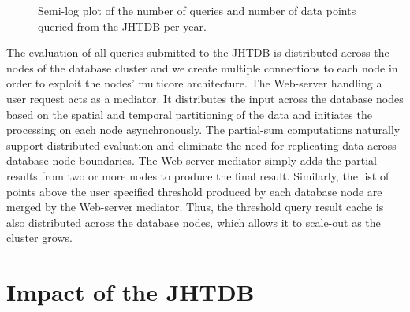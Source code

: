 \documentclass[10pt,twocolumn]{article}
\begin{document}
\begin{figure}
\centering
{}
\caption{Semi-log plot of the number of queries and number of data points queried from the JHTDB per year.}
\label{fig:usage}
\end{figure}

The evaluation of all queries submitted to the JHTDB is distributed across the nodes of the database cluster and we create multiple connections to each
node in order to exploit the nodes' multicore architecture. The Web-server handling a user request acts as a mediator. It distributes the input across the
database nodes based on the spatial and temporal partitioning of the data and initiates the processing on each node asynchronously. The partial-sum
computations naturally support distributed evaluation and eliminate the need
for replicating data across database node boundaries. The Web-server mediator simply adds the partial results from two or more nodes to produce the
final result. Similarly, the list of points above the user specified threshold produced by each database node are merged by the Web-server mediator. 
Thus, the threshold query result cache is also distributed across the database nodes, which allows it to scale-out as the cluster grows.

\section{Impact of the JHTDB}
\end{document}
